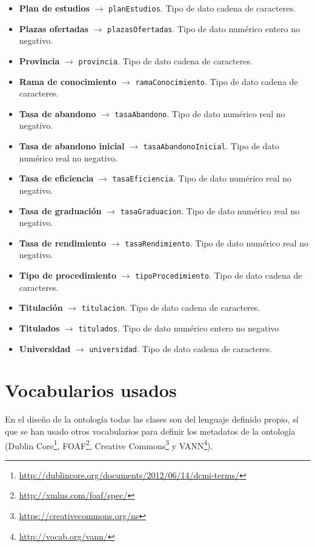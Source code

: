 \begin{itemize}
	\item \textbf{Plan de estudios} $\rightarrow$ {\tt planEstudios}. Tipo de dato cadena de caracteres.
	\item \textbf{Plazas ofertadas} $\rightarrow$ {\tt plazasOfertadas}. Tipo de dato numérico entero no negativo.
	\item \textbf{Provincia} $\rightarrow$ {\tt provincia}. Tipo de dato cadena de caracteres.
	\item \textbf{Rama de conocimiento} $\rightarrow$ {\tt ramaConocimiento}. Tipo de dato cadena de caracteres.
	\item \textbf{Tasa de abandono} $\rightarrow$ {\tt tasaAbandono}. Tipo de dato numérico real no negativo.
	\item \textbf{Tasa de abandono inicial} $\rightarrow$ {\tt tasaAbandonoInicial}. Tipo de dato numérico real no negativo.
	\item \textbf{Tasa de eficiencia} $\rightarrow$ {\tt tasaEficiencia}. Tipo de dato numérico real no negativo.
	\item \textbf{Tasa de graduación} $\rightarrow$ {\tt tasaGraduacion}. Tipo de dato numérico real no negativo.
	\item \textbf{Tasa de rendimiento} $\rightarrow$ {\tt tasaRendimiento}. Tipo de dato numérico real no negativo.
	\item \textbf{Tipo de procedimiento} $\rightarrow$ {\tt tipoProcedimiento}. Tipo de dato cadena de caracteres.
	\item \textbf{Titulación} $\rightarrow$ {\tt titulacion}. Tipo de dato cadena de caracteres.
	\item \textbf{Titulados} $\rightarrow$ {\tt titulados}. Tipo de dato numérico entero no negativo
	\item \textbf{Universidad} $\rightarrow$ {\tt universidad}. Tipo de dato cadena de caracteres.
\end{itemize}

\newpage
\section{Vocabularios usados}

En el diseño de la ontología todas las clases son del lenguaje definido propio, sí que se han usado otros vocabularios para definir los metadatos de la ontología (Dublin Core\footnote{\url{http://dublincore.org/documents/2012/06/14/dcmi-terms/}}, FOAF\footnote{\url{http://xmlns.com/foaf/spec/}}, Creative Commons\footnote{\url{https://creativecommons.org/ns}} y VANN\footnote{\url{http://vocab.org/vann/}}). \bigskip

